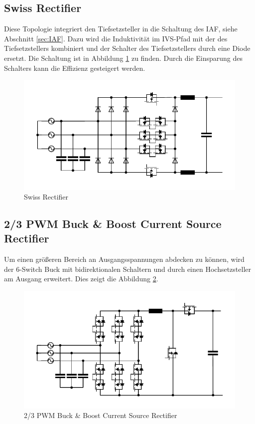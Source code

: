 	\subsection{Swiss Rectifier}
		Diese Topologie integriert den Tiefsetzsteller in die Schaltung des \gls{IAF}, siehe Abschnitt \ref{sec:IAF}. Dazu wird die Induktivität im IVS-Pfad mit der des Tiefsetzstellers kombiniert und der Schalter des Tiefsetzstellers durch eine Diode ersetzt. Die Schaltung ist in Abbildung \ref{fig:swiss} zu finden. Durch die Einsparung des Schalters kann die Effizienz gesteigert werden.
		\begin{figure}
			\centering
			\includegraphics[width=0.75\linewidth]{content/Grafiken/Swiss}
			\caption{Swiss Rectifier}
			\label{fig:swiss}
		\end{figure}
		\pagebreak
	\subsection{2/3 PWM Buck \& Boost Current Source Rectifier} \label{sec:2/3BuckBoost}
		Um einen größeren Bereich an Ausgangsspannungen abdecken zu können, wird der 6-Switch Buck mit bidirektionalen Schaltern und durch einen Hochsetzsteller am Ausgang erweitert. Dies zeigt die Abbildung \ref{fig:23pwmbuckboost}. 
		\begin{figure}
			\centering
			\includegraphics[width=0.75\linewidth]{content/Grafiken/23PWMBuckBoost}
			\caption{2/3 PWM Buck \& Boost Current Source Rectifier}
			\label{fig:23pwmbuckboost}
		\end{figure}
	
